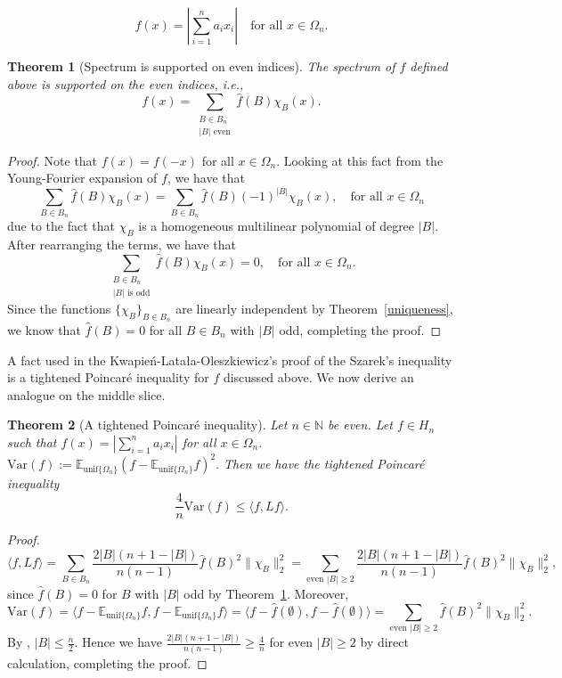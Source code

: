 \documentclass[11pt]{article}
\newtheorem{theorem}{Theorem}
\begin{document}
\[
f(x)=|\sum_{i=1}^n a_i x_i| \quad \text{for all } x \in \Omega_n.
\]
\begin{theorem}[Spectrum is supported on even indices] \label{eveness}
The spectrum of $f$ defined above is supported on the even indices, i.e., 
\[
f(x) = \sum_{\substack{B \in B_n\\ |B| \text{ even}}} \widehat{f}(B)\chi_B(x).
\]    
\end{theorem}
\begin{proof}
Note that $f(x)=f(-x)$ for all $x \in \Omega_n$. Looking at this fact from the Young-Fourier expansion of $f$, we have that
\[
\sum_{B \in B_n} \widehat f(B)\chi_B(x)= \sum_{B \in B_n}\widehat{f}(B)(-1)^{|B|}\chi_B(x), \quad \text{for all } x \in \Omega_n
\]
due to the fact that $\chi_B$ is a homogeneous multilinear polynomial of degree $|B|$. After rearranging the terms, we have that 
\[
\sum_{\substack{B \in B_n\\|B| \text{ is odd}}} \widehat{f}(B)\chi_B(x)=0,\quad \text{for all }x \in \Omega_n.
\]
Since the functions $\{\chi_B\}_{B\in B_n}$ are linearly independent by Theorem~\ref{uniqueness}, we know that $\widehat{f}(B)=0$ for all $B \in B_n$ with $|B|$ odd, completing the proof.     
\end{proof}


A fact used in the Kwapie\'n-Lata\l a-Oleszkiewicz's proof of the Szarek's inequality is a tightened Poincar\'e inequality for $f$ discussed above. We now derive an analogue on the middle slice. 
\begin{theorem}[A tightened Poincar\'e inequality] \label{Poincare}
 Let $n\in \mathbb{N}$ be even. Let $f\in H_n$ such that $f(x)=|\sum_{i=1}^n a_ix_i|$ for all $x \in \Omega_n$.  $\mathrm{Var}(f):=\mathbb{E}_{\mathrm{unif}\{\Omega_n\}}(f - \mathbb{E}_{\mathrm{unif}\{\Omega_n\}} f)^2.$ Then we have the tightened Poincar\'e inequality 
 \[
 \frac{4}{n}\mathrm{Var}(f) \leq \langle f,Lf \rangle.
 \]
\end{theorem}
\begin{proof}
\[
\langle f,Lf \rangle = \sum_{B \in B_n} \frac{2|B|(n+1-|B|)}{n(n-1)}\widehat f(B)^2 \|\chi_B\|_2^2 = \sum_{\text{even } |B| \geq 2 }\frac{2|B|(n+1-|B|)}{n(n-1)}\widehat f(B)^2 \|\chi_B\|_2^2,
\]
since $\widehat{f}(B)=0$ for $B$  with $|B|$ odd by Theorem~\ref{eveness}. Moreover,
\[
\mathrm{Var}(f) = \langle f - \mathbb{E}_{\mathrm{unif}\{\Omega_n\}} f, f - \mathbb{E}_{\mathrm{unif}\{\Omega_n\}} f \rangle = \langle f - \widehat f(\emptyset) , f - \widehat f(\emptyset) \rangle = \sum_{\text{even } |B| \geq 2 }\widehat f(B)^2 \|\chi_B\|_2^2.
\]
By \cite[Lemma 2]{Filmus16}, $|B| \leq \frac{n}{2}$. Hence we have $\frac{2|B|(n+1-|B|)}{n(n-1)} \geq \frac{4}{n}$ for even $|B| \geq 2$ by direct calculation, completing the proof. 
\end{proof}
\end{document}
